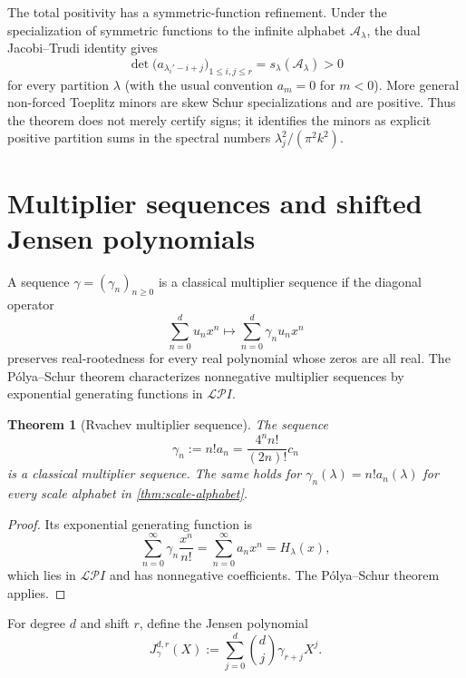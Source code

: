 \documentclass[11pt]{article}
\numberwithin{equation}{section}
\newtheorem{theorem}{Theorem}[section]
\theoremstyle{definition}
\theoremstyle{remark}
\begin{document}
The total positivity has a symmetric-function refinement.  Under the specialization of symmetric functions to the infinite alphabet $\mathcal A_\lambda$, the dual Jacobi--Trudi identity gives
\begin{equation}\label{eq:schur-minor}
 \det\bigl(a_{\lambda_i'-i+j}\bigr)_{1\le i,j\le r}
 =s_\lambda(\mathcal A_\lambda)>0
\end{equation}
for every partition $\lambda$ (with the usual convention $a_m=0$ for $m<0$).  More general non-forced Toeplitz minors are skew Schur specializations and are positive.  Thus the theorem does not merely certify signs; it identifies the minors as explicit positive partition sums in the spectral numbers $\lambda_j^2/(\pi^2k^2)$.

\section{Multiplier sequences and shifted Jensen polynomials}\label{sec:multiplier}

A sequence $\gamma=(\gamma_n)_{n\ge0}$ is a classical multiplier sequence if the diagonal operator
\[
 \sum_{n=0}^{d}u_nx^n\longmapsto\sum_{n=0}^{d}\gamma_nu_nx^n
\]
preserves real-rootedness for every real polynomial whose zeros are all real.  The Pólya--Schur theorem characterizes nonnegative multiplier sequences by exponential generating functions in $\mathcal{LP}\!I$.

\begin{theorem}[Rvachev multiplier sequence]\label{thm:multiplier}
The sequence
\begin{equation}\label{eq:gamma}
 \gamma_n:=n!a_n=\frac{4^n n!}{(2n)!}c_n
\end{equation}
is a classical multiplier sequence.  The same holds for
$\gamma_n(\lambda)=n!a_n(\lambda)$ for every scale alphabet in \cref{thm:scale-alphabet}.
\end{theorem}
\begin{proof}
Its exponential generating function is
\[
 \sum_{n=0}^{\infty}\gamma_n\frac{x^n}{n!}
 =\sum_{n=0}^{\infty}a_nx^n=H_\lambda(x),
\]
which lies in $\mathcal{LP}\!I$ and has nonnegative coefficients.  The Pólya--Schur theorem applies.
\end{proof}

For degree $d$ and shift $r$, define the Jensen polynomial
\begin{equation}\label{eq:jensen}
 J_{\gamma}^{d,r}(X):=\sum_{j=0}^{d}\binom dj\gamma_{r+j}X^j.
\end{equation}
\end{document}

